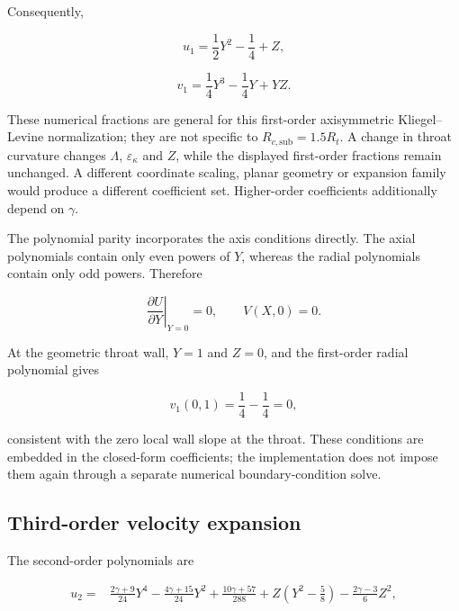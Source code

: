 Consequently,

\begin{equation}
    \boxed{
    u_1=\frac12Y^2-\frac14+Z
    },
\end{equation}

\begin{equation}
    \boxed{
    v_1=\frac14Y^3-\frac14Y+YZ
    }.
\end{equation}

These numerical fractions are general for this first-order axisymmetric
Kliegel--Levine normalization; they are not specific to
\(R_{c,\mathrm{sub}}=1.5R_t\).  A change in throat curvature changes
\(\Lambda\), \(\varepsilon_\kappa\) and \(Z\), while the displayed
first-order fractions remain unchanged.  A different coordinate scaling,
planar geometry or expansion family would produce a different coefficient
set.  Higher-order coefficients additionally depend on \(\gamma\).

The polynomial parity incorporates the axis conditions directly.  The axial
polynomials contain only even powers of \(Y\), whereas the radial polynomials
contain only odd powers.  Therefore

\begin{equation}
    \left.\frac{\partial U}{\partial Y}\right|_{Y=0}=0,
    \qquad
    V(X,0)=0.
\end{equation}

At the geometric throat wall, \(Y=1\) and \(Z=0\), and the first-order radial
polynomial gives

\begin{equation}
    v_1(0,1)=\frac14-\frac14=0,
\end{equation}

consistent with the zero local wall slope at the throat.  These conditions are
embedded in the closed-form coefficients; the implementation does not impose
them again through a separate numerical boundary-condition solve.

\subsection{Third-order velocity expansion}

The second-order polynomials are

\begin{align}
u_2={}&
    \frac{2\gamma+9}{24}Y^4
    -\frac{4\gamma+15}{24}Y^2
    +\frac{10\gamma+57}{288}
    +Z\left(Y^2-\frac58\right)
    -\frac{2\gamma-3}{6}Z^2,
\end{align}

